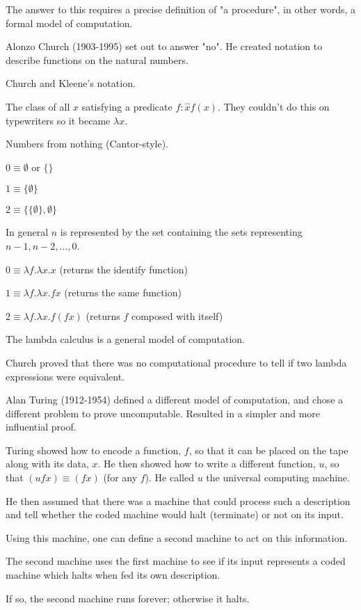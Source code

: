 \documentclass{article}
\begin{document}
The answer to this requires a precise definition of "a procedure", in other words, a formal model of computation. 

Alonzo Church (1903-1995) set out to answer "no". He created notation to describe functions on the natural numbers. 

Church and Kleene's notation. 

The class of all $x$ satisfying a predicate $f: \hat{x}f(x)$. They couldn't do this on typewriters so it became $\lambda x$.

Numbers from nothing (Cantor-style).

$0 \equiv \emptyset$ or $\{\}$

$1 \equiv \{\emptyset\}$

$2 \equiv \{\{\emptyset\},\emptyset\}$

In general $n$ is represented by the set containing the sets representing $n-1, n-2, \ldots, 0$.

$0 \equiv \lambda f.\lambda x.x$ (returns the identify function)

$1 \equiv \lambda f. \lambda x.fx$ (returns the same function)

$2 \equiv \lambda f. \lambda x.f(fx)$ (returns $f$ composed with itself)

The lambda calculus is a general model of computation. 

Church proved that there was no computational procedure to tell if two lambda expressions were equivalent. 

Alan Turing (1912-1954) defined a different model of computation, and chose a different problem to prove uncomputable. Resulted in a simpler and more influential proof. 

Turing showed how to encode a function, $f$, so that it can be placed on the tape along with its data, $x$. He then showed how to write a different function, $u$, so that $(u f x) \equiv (f x)$ (for any $f$). He called $u$ the universal computing machine. 

He then assumed that there was a machine that could process such a description and tell whether the coded machine would halt (terminate) or not on its input. 

Using this machine, one can define a second machine to act on this information. 

The second machine uses the first machine to see if its input represents a coded machine which halts when fed its own description. 

If so, the second machine runs forever; otherwise it halts. 
\end{document}
